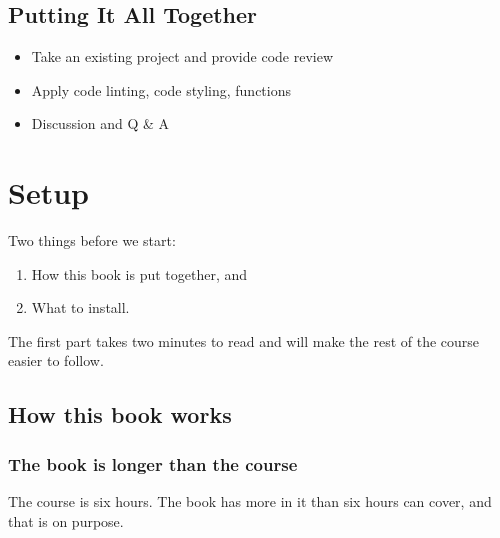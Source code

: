 \documentclass[
  letterpaper,
  justified,
  a4paper]{tufte-book}
\providecommand{\tightlist}{%
  \setlength{\itemsep}{0pt}\setlength{\parskip}{0pt}}
\providecommand{\tightlist}{%
  \setlength{\itemsep}{0pt}\setlength{\parskip}{0pt}}
\begin{document}
\section*{Putting It All Together}\label{putting-it-all-together}


\begin{itemize}
\tightlist
\item
  Take an existing project and provide code review
\item
  Apply code linting, code styling, functions
\item
  Discussion and Q \& A
\end{itemize}


\chapter*{Setup}\label{setup}


Two things before we start:

\begin{enumerate}
\def\labelenumi{\arabic{enumi}.}
\tightlist
\item
  How this book is put together, and
\item
  What to install.
\end{enumerate}

The first part takes two minutes to read and will make the rest of the
course easier to follow.

\section*{How this book works}\label{how-this-book-works}


\subsection*{The book is longer than the
course}\label{the-book-is-longer-than-the-course}

The course is six hours. The book has more in it than six hours can
cover, and that is on purpose.
\end{document}
